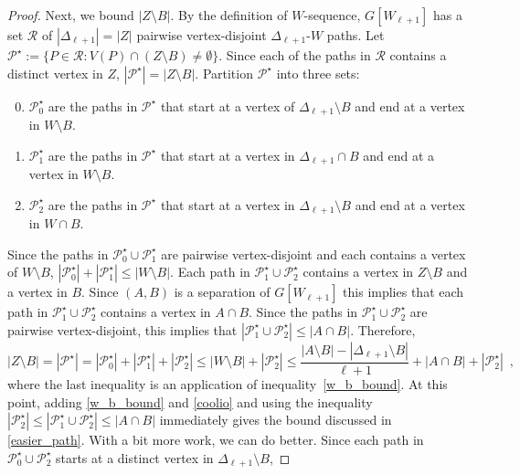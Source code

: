 \documentclass{patmorin}
\newcommand{\pat}[1]{\textcolor{Blue}{[Pat: #1]}}
\begin{document}
\begin{proof}
Next, we bound $|Z\setminus B|$.  By the definition of $W$-sequence, $G[W_{\ell+1}]$ has a set $\mathcal{R}$ of $|\Delta_{\ell+1}|=|Z|$ pairwise vertex-disjoint $\Delta_{\ell+1}$-$W$ paths.  Let $\mathcal{P}^\star:=\{P\in\mathcal{R}: V(P)\cap (Z\setminus B)\neq\emptyset\}$.
Since each of the paths in $\mathcal{R}$ contains a distinct vertex in $Z$, $|\mathcal{P}^\star|=|Z\setminus B|$.  Partition $\mathcal{P}^\star$ into three sets:

  \begin{enumerate}\setcounter{enumi}{-1}
      \item $\mathcal{P}^\star_0$ are the paths in $\mathcal{P}^\star$ that start at a vertex of $\Delta_{\ell+1}\setminus B$ and end at a vertex in $W\setminus B$.
      \item $\mathcal{P}^\star_1$ are the paths in $\mathcal{P}^\star$ that start at a vertex in $\Delta_{\ell+1}\cap B$ and end at a vertex in $W\setminus B$.
      \item $\mathcal{P}^\star_2$ are the paths in $\mathcal{P}^\star$ that start at a vertex in $\Delta_{\ell+1}\setminus B$ and end at a vertex in $W\cap B$.
  \end{enumerate}
  Since the paths in $\mathcal{P}_0^\star\cup\mathcal{P}_1^\star$ are pairwise vertex-disjoint and each contains a vertex of $W\setminus B$, $|\mathcal{P}_0^\star|+|\mathcal{P}_1^\star|\le|W\setminus B|$.
  Each path in $\mathcal{P}_1^\star\cup \mathcal{P}_2^\star$ contains a vertex in $Z\setminus B$ and a vertex in $B$.  Since $(A,B)$ is a separation of $G[W_{\ell+1}]$ this implies that each path in $\mathcal{P}_1^\star\cup \mathcal{P}_2^\star$ contains a vertex in $A\cap B$. Since the paths in  $\mathcal{P}_1^\star\cup \mathcal{P}_2^\star$ are pairwise vertex-disjoint, this implies that $|\mathcal{P}_1^\star\cup \mathcal{P}_2^\star|\le |A\cap B|$. Therefore,
  \begin{equation}
     |Z\setminus B| = |\mathcal{P}^\star| = |\mathcal{P}_0^{\star}| + |\mathcal{P}_1^\star| + |\mathcal{P}_2^{\star}|
     \le |W\setminus B| + |\mathcal{P}_2^\star|
     \le \frac{|A\setminus B|-|\Delta_{\ell+1}\setminus B|}{\ell+1}+|A\cap B|+|\mathcal{P}_2^\star|
     \enspace , \label{coolio}
  \end{equation}
  where the last inequality is an application of inequality~\eqref{w_b_bound}.  At this point, adding \eqref{w_b_bound} and \eqref{coolio} and using the inequality $|\mathcal{P}_2^\star| \le |\mathcal{P}_1^\star\cup\mathcal{P}_2^\star|\le |A\cap B|$ immediately gives the bound discussed in \cref{easier_path}.  With a bit more work, we can do better.  Since each path in $\mathcal{P}_0^\star\cup\mathcal{P}^\star_2$ starts at a distinct vertex in $\Delta_{\ell+1}\setminus B$,

\end{proof}
\end{document}
